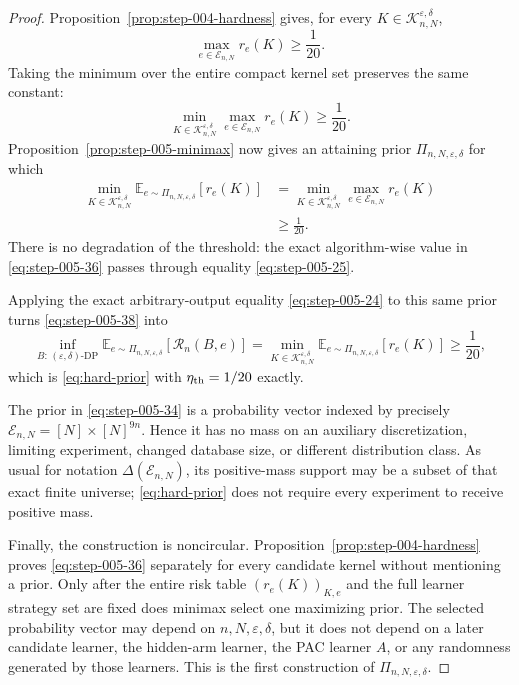 \begin{proof}

Proposition~\ref{prop:step-004-hardness} gives, for every
\(K\in\mathcal K_{n,N}^{\varepsilon,\delta}\),
\[
\max_{e\in\mathcal E_{n,N}}r_e(K)\ge\frac1{20}.
\tag{36}\label{eq:step-005-36}
\]
Taking the minimum over the entire compact kernel set preserves the same constant:
\[
\min_{K\in\mathcal K_{n,N}^{\varepsilon,\delta}}
\max_{e\in\mathcal E_{n,N}}r_e(K)
\ge\frac1{20}.
\tag{37}\label{eq:step-005-37}
\]
Proposition~\ref{prop:step-005-minimax} now gives an attaining prior
\(\Pi_{n,N,\varepsilon,\delta}\) for which
\[
\begin{aligned}
\min_{K\in\mathcal K_{n,N}^{\varepsilon,\delta}}
\mathbb E_{e\sim\Pi_{n,N,\varepsilon,\delta}}[r_e(K)]
&=
\min_{K\in\mathcal K_{n,N}^{\varepsilon,\delta}}
\max_{e\in\mathcal E_{n,N}}r_e(K)\\
&\ge\frac1{20}.
\end{aligned}
\tag{38}\label{eq:step-005-38}
\]
There is no degradation of the threshold: the exact algorithm-wise value in \eqref{eq:step-005-36} passes through equality \eqref{eq:step-005-25}.

Applying the exact arbitrary-output equality \eqref{eq:step-005-24} to this same prior turns \eqref{eq:step-005-38} into
\[
\inf_{B:\,(\varepsilon,\delta)\text{-DP}}
\mathbb E_{e\sim\Pi_{n,N,\varepsilon,\delta}}
[\mathcal R_n(B,e)]
=
\min_{K\in\mathcal K_{n,N}^{\varepsilon,\delta}}
\mathbb E_{e\sim\Pi_{n,N,\varepsilon,\delta}}[r_e(K)]
\ge\frac1{20},
\tag{39}\label{eq:step-005-39}
\]
which is \eqref{eq:hard-prior} with
\(\eta_{\rm th}=1/20\) exactly.

The prior in \eqref{eq:step-005-34} is a probability vector indexed by precisely
\(\mathcal E_{n,N}=[N]\times[N]^{9n}\). Hence it has no mass on an auxiliary discretization, limiting experiment, changed database size, or different distribution class. As usual for notation
\(\Delta(\mathcal E_{n,N})\), its positive-mass support may be a subset of that exact finite universe; \eqref{eq:hard-prior} does not require every experiment to receive positive mass.

Finally, the construction is noncircular. Proposition~\ref{prop:step-004-hardness} proves \eqref{eq:step-005-36} separately for every candidate kernel without mentioning a prior. Only after the entire risk table
\((r_e(K))_{K,e}\) and the full learner strategy set are fixed does minimax select one maximizing prior. The selected probability vector may depend on
\(n,N,\varepsilon,\delta\), but it does not depend on a later candidate learner, the hidden-arm learner, the PAC learner \(A\), or any randomness generated by those learners. This is the first construction of
\(\Pi_{n,N,\varepsilon,\delta}\).

\end{proof}


